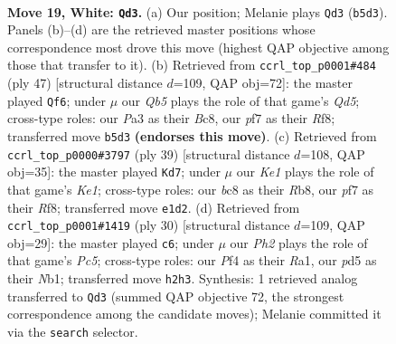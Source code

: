 \documentclass[11pt]{article}
\begin{document}
\clearpage

\begin{figure}[p]\centering
\begin{subfigure}{0.46\textwidth}\centering
\resizebox{\linewidth}{!}{%
\newchessgame
\chessboard[
  setfen={r1bq1k2/pp3pp1/n3p3/1Q1pP3/3n1P1r/PP6/6PP/R3KNNR w KQ - 1 19},
  showmover=false,
  pgfstyle=straightmove, color=movearrow, markmove={b5-d3}
]}
\caption{}
\end{subfigure}\hfill
\begin{subfigure}{0.46\textwidth}\centering
\resizebox{\linewidth}{!}{%
\newchessgame
\chessboard[
  setfen={r1b2rk1/pp4np/3p4/1NpP1pp1/2Pq4/1Q4P1/PP4BP/4RR1K b - - 3 24},
  showmover=false,
  pgfstyle=straightmove, color=movearrow, markmove={d4-f6}
]}
\caption{}
\end{subfigure}
\\[4pt]
\begin{subfigure}{0.46\textwidth}\centering
\resizebox{\linewidth}{!}{%
\newchessgame
\chessboard[
  setfen={1r2kr2/4p2p/pnppp1p1/q7/1R2PP2/P1N3Q1/1PP3PP/2K4R b - - 4 20},
  showmover=false,
  pgfstyle=straightmove, color=movearrow, markmove={e8-d7}
]}
\caption{}
\end{subfigure}\hfill
\begin{subfigure}{0.46\textwidth}\centering
\resizebox{\linewidth}{!}{%
\newchessgame
\chessboard[
  setfen={2rq1rk1/p4ppp/1p2p3/n1Pn4/Q2N4/3b2P1/PP3PBP/RNR3K1 w - - 3 16},
  showmover=false,
  pgfstyle=straightmove, color=movearrow, markmove={c5-c6}
]}
\caption{}
\end{subfigure}
\caption{\textbf{Move 19, White: \texttt{Qd3}.} (a) Our position; Melanie plays \texttt{Qd3} (\texttt{b5d3}). Panels (b)--(d) are the retrieved master positions whose correspondence most drove this move (highest QAP objective among those that transfer to it). (b) Retrieved from \texttt{ccrl\_top\_p0001\#484} (ply 47) [structural distance $d$=109, QAP obj=72]: the master played \texttt{Qf6}; under $\mu$ our \emph{Qb5} plays the role of that game's \emph{Qd5}; cross-type roles: our \emph{P}a3 as their \emph{B}c8, our \emph{p}f7 as their \emph{R}f8; transferred move \texttt{b5d3} \textbf{(endorses this move)}. (c) Retrieved from \texttt{ccrl\_top\_p0000\#3797} (ply 39) [structural distance $d$=108, QAP obj=35]: the master played \texttt{Kd7}; under $\mu$ our \emph{Ke1} plays the role of that game's \emph{Ke1}; cross-type roles: our \emph{b}c8 as their \emph{R}b8, our \emph{p}f7 as their \emph{R}f8; transferred move \texttt{e1d2}. (d) Retrieved from \texttt{ccrl\_top\_p0001\#1419} (ply 30) [structural distance $d$=109, QAP obj=29]: the master played \texttt{c6}; under $\mu$ our \emph{Ph2} plays the role of that game's \emph{Pc5}; cross-type roles: our \emph{P}f4 as their \emph{R}a1, our \emph{p}d5 as their \emph{N}b1; transferred move \texttt{h2h3}. Synthesis: 1 retrieved analog transferred to \texttt{Qd3} (summed QAP objective 72, the strongest correspondence among the candidate moves); Melanie committed it via the \texttt{search} selector.}
\label{fig:thought-m36}
\end{figure}
\end{document}
